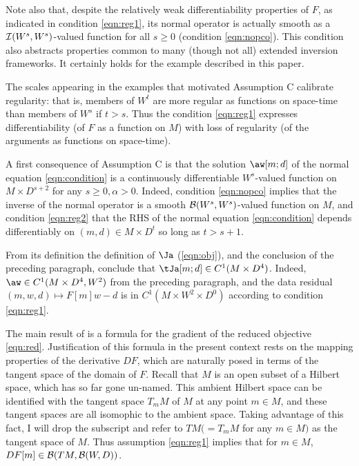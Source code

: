 Note also that, despite the relatively weak differentiability properties of $F$, as
indicated in condition \ref{eqn:reg1}, its normal operator is actually
smooth as a ${\cal I}(W^s,W^s)$-valued function for all $s\ge 0$
(condition \ref{eqn:nopco}). This condition also abstracts properties
common to many (though not all) extended inversion frameworks. It 
certainly holds for the example described in this paper.

The scales appearing in the examples that motivated Assumption C
calibrate regularity: that is, members of $W^t$ are more regular as
functions on space-time than members of $W^s$ if $t>s$. Thus the
condition \ref{eqn:reg1} expresses differentiability (of $F$ as a
function on $M$) with loss of regularity (of the arguments as
functions on space-time).

A first consequence of Assumption C is that the solution $\aw[m;d]$ of
the normal equation \ref{eqn:condition} is a continuously differentiable $W^s$-valued
function on $M \times D^{s+2}$ for any $s \ge 0, \alpha>0$. Indeed, condition
\ref{eqn:nopco} implies that the inverse of the normal operator is a
smooth ${\cal B}(W^s,W^s)$-valued function on $M$, and condition
\ref{eqn:reg2} that the RHS of the normal equation \ref{eqn:condition}
depends differentiably on $(m,d) \in M \times D^t$ so long as $t>s+1$.

From its definition
the definition of $\Ja$ (\ref{eqn:obj}), and the conclusion of the
preceding paragraph, conclude that $\tJa[m;d] \in C^1(M \times D^4)$.
Indeed, $\aw \in C^1(M \times D^4,W^2)$ from the preceding paragraph,
and the data residual $(m,w,d) \mapsto F[m]w-d$ is in $C^1(M \times
W^2 \times D^0)$ according to condition \ref{eqn:reg1}.  
  
The main result of \cite[]{GolubPereyra:73} is a formula for the
gradient of the reduced objective \ref{eqn:red}.  Justification of this
formula in the present context rests on the mapping properties of the
derivative $DF$, which are naturally posed in
terms of the tangent space of the domain of $F$.  Recall that $M$ is
an open subset of a Hilbert space, which has so far gone
un-named. This ambient Hilbert space can be identified with the
tangent space $T_mM$ of $M$ at any point $m \in M$, and these tangent
spaces are all isomophic to the ambient space. Taking advantage of
this fact, I will drop the subscript and refer to $TM (=T_mM$ for any
$m \in M)$ as the tangent space of $M$. Thus assumption \ref{eqn:reg1}
implies that for $m \in M$, $DF[m] \in {\cal B}(TM,{\cal B}(W,D))$.

